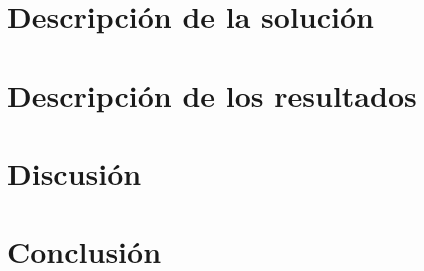 \documentclass[a4paper, 12pt]{article}
\begin{document}
\section{Descripción de la solución}

\section{Descripción de los resultados}

\section{Discusión}

\section{Conclusión}



\nocite{*}
\end{document}
